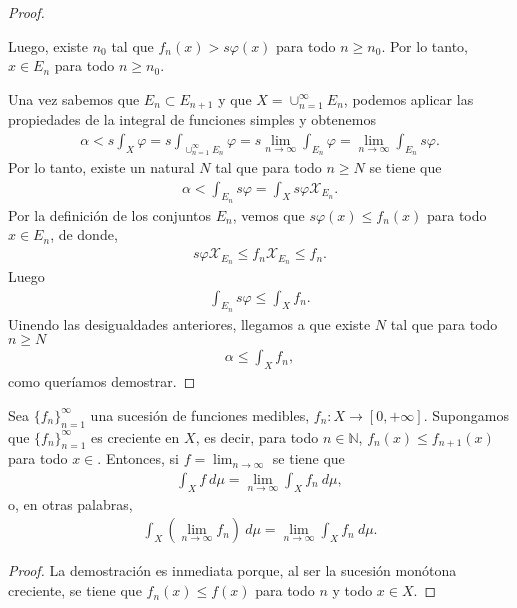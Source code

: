 \begin{proof}
\begin{enumerate}
    Luego, existe $n_0$ tal que $f_n(x) > s\varphi(x)$ para todo $n \ge n_0$. Por lo tanto, $x \in E_n$ para todo $n \ge n_0$.
\end{enumerate}
Una vez sabemos que $E_n \subset E_{n+1}$ y que $X = \cup_{n=1}^{\infty}{E_n}$, podemos aplicar las propiedades de la integral de funciones simples y obtenemos
\begin{align*}
    \alpha < s\int_{X}{\varphi} = s\int_{\cup_{n=1}^{\infty}{E_n}}{\varphi} = s\lim_{n \to \infty}{\int_{E_n}{\varphi}} = \lim_{n \to \infty}{\int_{E_n}{s\varphi}}.
\end{align*}
Por lo tanto, existe un natural $N$ tal que para todo $n \ge N$ se tiene que
\begin{align*}
    \alpha < \int_{E_n}{s\varphi} = \int_{X}{s\varphi\mathcal{X}_{E_n}}.
\end{align*}
Por la definición de los conjuntos $E_n$, vemos que $s\varphi(x) \leq f_n(x)$ para todo $x \in E_n$, de donde,
\begin{align*}
    s\varphi\mathcal{X}_{E_n} \leq f_n\mathcal{X}_{E_n} \leq f_n.
\end{align*}
Luego
\begin{align*}
    \int_{E_n}{s\varphi} \leq \int_{X}{f_n}.
\end{align*}
Uinendo las desigualdades anteriores, llegamos a que existe $N$ tal que para todo $n \ge N$
\begin{align*}
    \alpha \leq \int_{X}{f_n},
\end{align*}
como queríamos demostrar.
\end{proof}

\begin{cor}
Sea  $\{ f_n \}_{n=1}^{\infty}$ una sucesión de funciones medibles, $f_n: X \longrightarrow [0,+\infty]$. Supongamos que $\{ f_n \}_{n=1}^{\infty}$  es creciente en $X$, es decir, para todo $n \in \mathbb{N}$, $f_n(x) \leq f_{n+1}(x)$ para todo $x \in $. Entonces, si $f = \lim_{n \to \infty}$ se tiene que
\begin{align*}
    \int_{X}{f \ d\mu} = \lim_{n \to \infty}{\int_{X}{f_n \ d\mu}},
\end{align*}
o, en otras palabras,
\begin{align*}
    \int_{X}{\left( \lim_{n \to \infty}{f_n}\right) \ d\mu} = \lim_{n \to \infty}{\int_{X}{f_n \ d\mu}}.
\end{align*}
\end{cor}

\begin{proof}
La demostración es inmediata porque, al ser la sucesión monótona creciente, se tiene que $f_n(x) \leq f(x)$ para todo $n$ y todo $x \in X$.
\end{proof}

